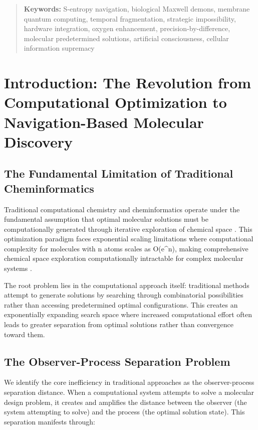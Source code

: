 \documentclass[11pt,a4paper]{article}
\begin{document}
\begin{abstract}
\textbf{Keywords:} S-entropy navigation, biological Maxwell demons, membrane quantum computing, temporal fragmentation, strategic impossibility, hardware integration, oxygen enhancement, precision-by-difference, molecular predetermined solutions, artificial consciousness, cellular information supremacy

\end{abstract}

\section{Introduction: The Revolution from Computational Optimization to Navigation-Based Molecular Discovery}

\subsection{The Fundamental Limitation of Traditional Cheminformatics}

Traditional computational chemistry and cheminformatics operate under the fundamental assumption that optimal molecular solutions must be computationally generated through iterative exploration of chemical space \cite{reymond2015chemical, walters2020virtual}. This optimization paradigm faces exponential scaling limitations where computational complexity for molecules with n atoms scales as O(e^n), making comprehensive chemical space exploration computationally intractable for complex molecular systems \cite{bohacek1996art}.

The root problem lies in the computational approach itself: traditional methods attempt to generate solutions by searching through combinatorial possibilities rather than accessing predetermined optimal configurations. This creates an exponentially expanding search space where increased computational effort often leads to greater separation from optimal solutions rather than convergence toward them.

\subsection{The Observer-Process Separation Problem}

We identify the core inefficiency in traditional approaches as the observer-process separation distance. When a computational system attempts to solve a molecular design problem, it creates and amplifies the distance between the observer (the system attempting to solve) and the process (the optimal solution state). This separation manifests through:
\end{document}
